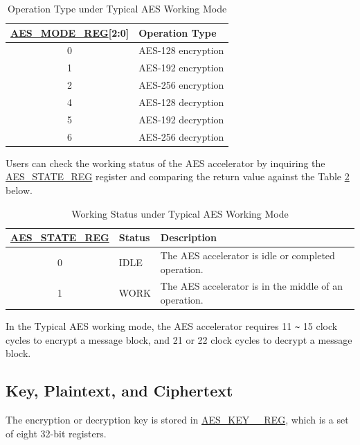 \documentclass[main\_\_EN.tex]{subfiles}
\begin{document}
\begin{longtable}[c]{ | c | l | }
\caption{Operation Type under Typical AES Working Mode}
\label{table:AESOperation}
\\\hline
\rowcolor{lightgray}
\hyperref[regdesc:AESMODEREG]{AES\_MODE\_REG}[2:0]     & Operation Type\\
    \hline
    0                   & AES-128 encryption    \\
    \hline
    1                   & AES-192 encryption    \\
    \hline
    2                   & AES-256 encryption    \\
    \hline
    4                   & AES-128 decryption    \\
    \hline
    5                   & AES-192 decryption    \\
    \hline
    6                   & AES-256 decryption    \\
    \hline
\end{longtable}

Users can check the working status of the AES accelerator by inquiring the \hyperref[regdesc:AESSTATEREG]{AES\_STATE\_REG} register and comparing the return value against the Table \ref{table:AESStateValue-aes} below.

\begin{longtable}[c]{ | c | l | l| }
\caption{Working Status under Typical AES Working Mode}
\label{table:AESStateValue-aes}
\\\hline
\rowcolor{lightgray}
\hyperref[regdesc:AESSTATEREG]{AES\_STATE\_REG} & Status &  Description \\ \hline

    0                   & IDLE      &   The AES accelerator is idle or completed operation.\\ \hline
    1                   & WORK      &   The AES accelerator is in the middle of an operation.     \\ \hline
\end{longtable}

In the Typical AES working mode, the AES accelerator requires 11 \verb+~+ 15 clock cycles to encrypt a message block, and 21 or 22 clock cycles to decrypt a message block.


\subsection{Key, Plaintext, and Ciphertext}

The encryption or decryption key is stored in \hyperref[regdesc:AESKEYnREG]{AES\_KEY\_\_REG}, which is a set of eight 32-bit registers.
\end{document}
